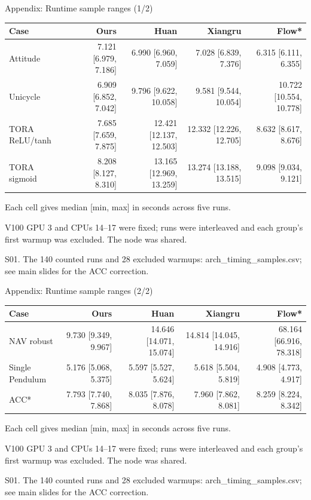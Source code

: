 \documentclass[aspectratio=169,11pt]{beamer}
\newcommand{\src}[1]{\par\vfill{\fontsize{7}{9}\selectfont\color{gray}#1\par}}
\begin{document}
\begin{frame}[t]{Appendix: Runtime sample ranges (1/2)}
\relax
\relax
{\scriptsize\setlength{\tabcolsep}{3.2pt}\renewcommand{\arraystretch}{1.18}
\noindent\begin{tabular*}{\linewidth}{@{\extracolsep{\fill}}lrrrr@{}}\toprule
\textbf{Case} & \textbf{Ours} & \textbf{Huan} & \textbf{Xiangru} & \textbf{Flow*}\\ \midrule
Attitude & 7.121 [6.979, 7.186] & 6.990 [6.960, 7.059] & 7.028 [6.839, 7.376] & 6.315 [6.111, 6.355]\\
Unicycle & 6.909 [6.852, 7.042] & 9.796 [9.622, 10.058] & 9.581 [9.544, 10.054] & 10.722 [10.554, 10.778]\\
TORA ReLU/tanh & 7.685 [7.659, 7.875] & 12.421 [12.137, 12.503] & 12.332 [12.226, 12.705] & 8.632 [8.617, 8.676]\\
TORA sigmoid & 8.208 [8.127, 8.310] & 13.165 [12.969, 13.259] & 13.274 [13.188, 13.515] & 9.098 [9.034, 9.121]\\
\bottomrule\end{tabular*}\par{}}\vspace{0.4cm}Each cell gives median [min, max] in seconds across five runs.\par{}V100 GPU 3 and CPUs 14–17 were fixed; runs were interleaved and each group's first warmup was excluded. The node was shared.
\src{S01. The 140 counted runs and 28 excluded warmups: arch\_timing\_samples.csv; see main slides for the ACC correction.}
\end{frame}

\begin{frame}[t]{Appendix: Runtime sample ranges (2/2)}
\relax
\relax
{\scriptsize\setlength{\tabcolsep}{3.2pt}\renewcommand{\arraystretch}{1.18}
\noindent\begin{tabular*}{\linewidth}{@{\extracolsep{\fill}}lrrrr@{}}\toprule
\textbf{Case} & \textbf{Ours} & \textbf{Huan} & \textbf{Xiangru} & \textbf{Flow*}\\ \midrule
NAV robust & 9.730 [9.349, 9.967] & 14.646 [14.071, 15.074] & 14.814 [14.045, 14.916] & 68.164 [66.916, 78.318]\\
Single Pendulum & 5.176 [5.068, 5.375] & 5.597 [5.527, 5.624] & 5.618 [5.504, 5.819] & 4.908 [4.773, 4.917]\\
ACC* & 7.793 [7.740, 7.868] & 8.035 [7.876, 8.078] & 7.960 [7.862, 8.081] & 8.259 [8.224, 8.342]\\
\bottomrule\end{tabular*}\par{}}\vspace{0.4cm}Each cell gives median [min, max] in seconds across five runs.\par{}V100 GPU 3 and CPUs 14–17 were fixed; runs were interleaved and each group's first warmup was excluded. The node was shared.
\src{S01. The 140 counted runs and 28 excluded warmups: arch\_timing\_samples.csv; see main slides for the ACC correction.}
\end{frame}
\end{document}
